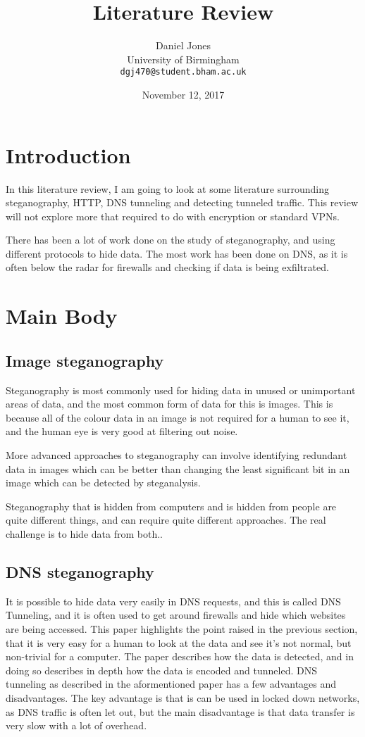 \documentclass[12pt]{article}
\title{Literature Review}
\author{Daniel Jones\\
  \small{University of Birmingham}\\
  \small{\texttt{dgj470@student.bham.ac.uk}}
}
\date{November 12, 2017}
\begin{document}
\maketitle
\tableofcontents
\newpage
\section{Introduction}
In this literature review, I am going to look at some literature surrounding steganography, HTTP, DNS tunneling and detecting tunneled traffic. This review will not explore more that required to do with encryption or standard VPNs.

There has been a lot of work done on the study of steganography, and using different protocols to hide data. The most work has been done on DNS, as it is often below the radar for firewalls and checking if data is being exfiltrated.
\section{Main Body}
\subsection{Image steganography}
Steganography is most commonly used for hiding data in unused or unimportant areas of data\cite{exploringsteno}, and the most common form of data for this is images. This is because all of the colour data in an image is not required for a human to see it, and the human eye is very good at filtering out noise\cite{exploringsteno}.

More advanced approaches to steganography can involve identifying redundant data in images\cite{introsteno} which can be better than changing the least significant bit in an image which can be detected by steganalysis\cite{introsteno}.

Steganography that is hidden from computers and is hidden from people are quite different things, and can require quite different approaches. The real challenge is to hide data from both.\cite{introsteno}.

\subsection{DNS steganography}
It is possible to hide data very easily in DNS requests, and this is called DNS Tunneling, and it is often used to get around firewalls and hide which websites are being accessed.\cite{detectingdns}
This paper highlights the point raised in the previous section, that it is very easy for a human to look at the data and see it's not normal, but non-trivial for a computer.
The paper describes how the data is detected, and in doing so describes in depth how the data is encoded and tunneled.
DNS tunneling as described in the aformentioned paper has a few advantages and disadvantages.
The key advantage is that is can be used in locked down networks, as DNS traffic is often let out, but the main disadvantage is that data transfer is very slow with a lot of overhead.
\end{document}
